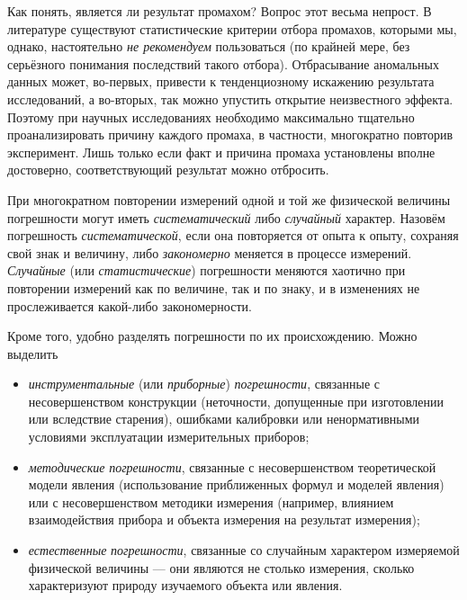 
Как понять, является ли  результат промахом? Вопрос этот весьма
непрост. В литературе существуют статистические
критерии отбора промахов, которыми мы, однако, настоятельно \emph{не рекомендуем}
пользоваться (по крайней мере, без серьёзного понимания последствий
такого отбора). Отбрасывание аномальных данных может, во-первых, привести
к тенденциозному искажению результата исследований, а во-вторых, так
можно упустить открытие неизвестного эффекта. Поэтому при научных
исследованиях необходимо максимально тщательно проанализировать причину
каждого промаха, в частности, многократно повторив эксперимент. Лишь
только если факт и причина промаха установлены вполне достоверно,
соответствующий результат можно отбросить.


При многократном повторении измерений одной и той же физической величины
погрешности могут иметь \emph{систематический} либо \emph{случайный}
характер. Назовём погрешность \emph{систематической}, если она повторяется
от опыта к опыту, сохраняя свой знак и величину, либо \emph{закономерно}
меняется в процессе измерений. \emph{Случайные} (или \emph{статистические})
погрешности меняются хаотично при повторении измерений как по величине,
так и по знаку, и в изменениях не прослеживается какой-либо закономерности.

Кроме того, удобно разделять погрешности по их происхождению. Можно
выделить
\begin{itemize}
    \item \emph{инструментальные} (или \emph{приборные}) \emph{погрешности},
связанные с несовершенством конструкции (неточности, допущенные при
изготовлении или вследствие старения), ошибками калибровки или ненормативными
условиями эксплуатации измерительных приборов;
    \item \emph{методические} \emph{погрешности}, связанные с несовершенством
теоретической модели явления (использование приближенных формул и
моделей явления) или с несовершенством методики измерения (например,
влиянием взаимодействия прибора и объекта измерения на результат измерения);
    \item \emph{естественные} \emph{погрешности}, связанные со случайным
характером
измеряемой физической величины --- они являются не столько
 измерения, сколько характеризуют
природу изучаемого объекта или явления.
\end{itemize}

